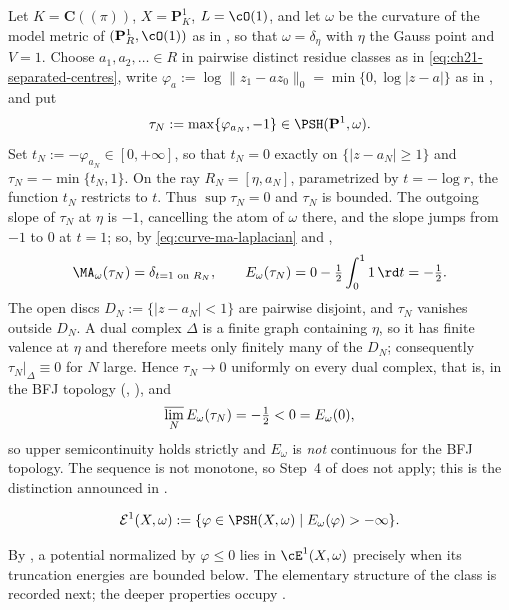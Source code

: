 \begin{example}
\label{ex:ch26-usc-strict}
Let \(K=\mathbf C((\pi))\), \(X=\mathbf P^1_K\), \(L=\cO(1)\), and let
\(\omega\) be the curvature of the model metric of
\((\mathbf P^1_R,\cO(1))\) as in , so that
\(\omega=\delta_\eta\) with \(\eta\) the Gauss point and \(V=1\).  Choose
\(a_1,a_2,\ldots\in R\) in pairwise distinct residue classes as in
\eqref{eq:ch21-separated-centres}, write
\(\varphi_{a}:=\log\lVert z_1-az_0\rVert_0=\min\{0,\log|z-a|\}\) as in
, and put
\[
 \tau_N:=\max\{\varphi_{a_N},-1\}\in\PSH(\mathbf P^1,\omega).
\]
Set \(t_N:=-\varphi_{a_N}\in[0,+\infty]\), so that \(t_N=0\) exactly on
\(\{|z-a_N|\geq1\}\) and \(\tau_N=-\min\{t_N,1\}\).  On the ray
\(R_N=[\eta,a_N]\), parametrized by \(t=-\log r\), the function \(t_N\)
restricts to \(t\).  Thus \(\sup\tau_N=0\) and \(\tau_N\) is bounded.  The
outgoing slope of \(\tau_N\) at \(\eta\) is \(-1\), cancelling the atom of
\(\omega\) there, and the slope jumps from \(-1\) to \(0\) at \(t=1\); so, by
\eqref{eq:curve-ma-laplacian} and ,
\[
 \MA_\omega(\tau_N)=\delta_{t=1\text{ on }R_N},
 \qquad
 E_\omega(\tau_N)=0-\tfrac12\int_0^11\,\rd t=-\tfrac12 .
\]
The open discs \(D_N:=\{|z-a_N|<1\}\) are pairwise disjoint, and
\(\tau_N\) vanishes outside \(D_N\).  A dual complex \(\Delta\) is a finite
graph containing \(\eta\), so it has finite valence at \(\eta\) and
therefore meets only finitely many of the \(D_N\); consequently
\(\tau_N|_\Delta\equiv0\) for \(N\) large.  Hence \(\tau_N\to0\) uniformly on
every dual complex, that is, in the BFJ topology
(,
), and
\[
 \varlimsup_N E_\omega(\tau_N)=-\tfrac12<0=E_\omega(0),
\]
so upper semicontinuity holds strictly and \(E_\omega\) is \emph{not}
continuous for the BFJ topology.  The sequence is not monotone, so
Step~4 of  does not apply; this is the
distinction announced in .
\end{example}

\begin{definition}
\label{def:e1}
\[
 \mathcal E^1(X,\omega)
 :=\{\varphi\in\PSH(X,\omega)\mid E_\omega(\varphi)>-\infty\}.
\]
\end{definition}

By , a potential normalized by
\(\varphi\leq0\) lies in \(\cE^1(X,\omega)\) precisely when its truncation
energies are bounded below.  The elementary structure of the class is
recorded next; the deeper properties occupy
.

